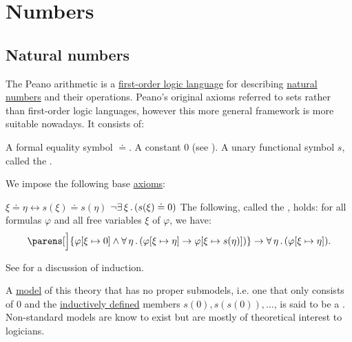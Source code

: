 \section{Numbers}\label{sec:numbers}
\subsection{Natural numbers}\label{subsec:natural_numbers}

\begin{definition}\label{def:peano_arithmetic}
  The Peano arithmetic is a \hyperref[def:first_order_language]{first-order logic language} for describing \hyperref[def:set_of_natural_numbers]{natural numbers} and their operations. Peano's original axioms referred to sets rather than first-order logic languages, however this more general framework is more suitable nowadays. It consists of:
  \begin{thmenum}
     A formal equality symbol \( \doteq \).
     A  constant \( 0 \) (see ).
     A unary functional symbol \( s \), called the .
  \end{thmenum}

  We impose the following base \hyperref[def:first_order_theory]{axioms}:
  \begin{thmenum}
     \( \xi \doteq \eta \leftrightarrow s(\xi) \doteq s(\eta) \)
     \( \neg \exists \thinspace \xi \thinspace . \thinspace (s(\xi) \doteq 0) \)
     The following, called the , holds: for all formulas \( \varphi \) and all free variables \( \xi \) of \( \varphi \), we have:
    \begin{equation*}
      \parens[\Big]{ \varphi[\xi \mapsto 0] \wedge \qforall \eta (\varphi[\xi \mapsto \eta] \to \varphi[\xi \mapsto s(\eta)]) } \to \qforall \eta (\varphi[\xi \mapsto \eta]).
    \end{equation*}

    See  for a discussion of induction.
  \end{thmenum}

  A \hyperref[def:first_order_semantics/satisfiability]{model} of this theory that has no proper submodels, i.e. one that only consists of \( 0 \) and the \hyperref[rem:induction]{inductively defined} members \( s(0), s(s(0)), \ldots \), is said to be a . Non-standard models are know to exist but are mostly of theoretical interest to logicians.


\end{definition}
